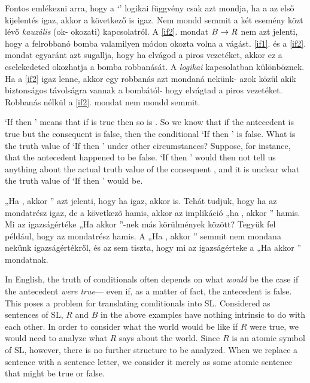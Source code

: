 Fontos emlékezni arra, hogy a `\eif'  logikai függvény csak azt mondja, ha a
az első kijelentés igaz, akkor a következő is igaz.
Nem mondd semmit a két esemény közt lévő \emph{kauzális} (ok- okozati) kapcsolatról.
A \ref{if2}. mondat $B \rightarrow R$ nem azt jelenti, hogy a felrobbanó bomba valamilyen módon okozta volna a vágást. \ref{if1}. és a \ref{if2}. mondat egyaránt azt sugallja, hogy ha elvágod a piros vezetéket, akkor ez a cselekedeted okozhatja a bomba robbanását.
A \emph{logikai} kapcsolatban különböznek.  Ha a \ref{if2} igaz lenne, akkor egy robbanás azt mondaná
nekünk- azok közül akik biztonságos távolságra vannak a bombától- hogy elvágtad a piros
vezetéket. Robbanás nélkül a \ref{if2}. mondat nem mondd semmit.




`If  then ' means that if  is true then so is . So we know that if the antecedent  is true but the consequent  is false, then the conditional `If  then ' is false. What is the truth value of `If  then ' under other circumstances? Suppose, for instance, that the antecedent  happened to be false. `If  then ' would then not tell us anything about the actual truth value of the consequent , and it is unclear what the truth value of `If  then ' would be.

„Ha , akkor ” azt jelenti, hogy ha  igaz, akkor  is. Tehát tudjuk, hogy ha
az  mondatrész igaz, de a következõ  hamis, akkor az implikáció „ha
 , akkor  ” hamis. Mi az igazságértéke „Ha  akkor ”-nek más körülmények között?
Tegyük fel például, hogy az  mondatrész hamis. A „Ha , akkor ” semmit nem mondana
 nekünk   igazságértékről, és az sem tiszta, hogy mi az igazságérteke a „Ha  akkor ” mondatnak.




In English, the truth of conditionals often depends on what \emph{would} be the case if the antecedent \emph{were true}--- even if, as a matter of fact, the antecedent is false. This poses a problem for translating conditionals into SL.  Considered as sentences of SL, $R$ and $B$ in the above examples have nothing intrinsic to do with each other. In order to consider what the world would be like if $R$ were true, we would need to analyze what $R$ says about the world. Since $R$ is an atomic symbol of SL, however, there is no further structure to be analyzed. When we replace a sentence with a sentence letter, we consider it merely as some atomic sentence that might be true or false.

